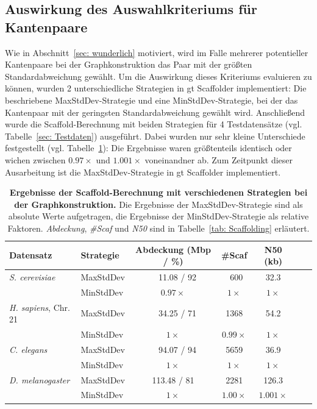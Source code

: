 \documentclass[a4paper,11pt,parskip,abstract=on]{scrartcl}
\begin{document}
\subsection{Auswirkung des Auswahlkriteriums für Kantenpaare}
\label{sec: wunderlich_assert}
Wie in Abschnitt~\ref{sec: wunderlich} motiviert, wird im Falle
mehrerer potentieller Kantenpaare bei der Graphkonstruktion das Paar
mit der größten Standardabweichung gewählt. Um die Auswirkung dieses
Kriteriums evaluieren zu können, wurden 2 unterschiedliche Strategien
in gt Scaffolder implementiert: Die beschriebene
MaxStdDev-Strategie und eine MinStdDev-Strategie, bei der das
Kantenpaar mit der geringsten Standardabweichung gewählt
wird. Anschließend wurde die Scaffold-Berechnung mit beiden Strategien
für 4 Testdatensätze (vgl. Tabelle~\ref{sec: Testdaten})
ausgeführt. Dabei wurden nur sehr kleine Unterschiede festgestellt
(vgl.  Tabelle~\ref{tab: stddev}): Die Ergebnisse waren größtenteils
identisch oder wichen zwischen $0.97\times$ und $1.001\times$
voneinandner ab. Zum Zeitpunkt dieser Ausarbeitung ist die
MaxStdDev-Strategie in gt Scaffolder implementiert.

\begin{table}
  \begin{tabular}{llccccc}
    \toprule
    Datensatz & Strategie & Abdeckung (Mbp / \%) & \#Scaf & N50 (kb)\\
    \midrule
    \textit{S. cerevisiae}
    & MaxStdDev  & ~~11.08 / 92  &      ~600   &  32.3      \\
    & MinStdDev  & $0.97\times$     &  $1\times$  & $1\times$    \\
    \midrule
    \textit{H. sapiens}, Chr. 21
    & MaxStdDev  & ~~34.25 / 71  &      1368   &  54.2      \\
    & MinStdDev  & $1\times$     &  $0.99\times$  & $1\times$    \\
    \midrule
    \textit{C. elegans}
    & MaxStdDev  & ~~94.07 / 94  &      5659   &  36.9      \\
    & MinStdDev  & $1\times$     &  $1\times$  & $1\times$    \\
    \midrule
    \textit{D. melanogaster}
    & MaxStdDev  & 113.48 / 81   &      2281   &  126.3     \\
    & MinStdDev  & $1\times$     &  $1.00\times$  & $1.001\times$    \\
    \bottomrule
  \end{tabular}
  \caption{\label{tab: stddev}\textbf{Ergebnisse der Scaffold-Berechnung mit
  verschiedenen Strategien bei der Graphkonstruktion.}
  Die Ergebnisse der MaxStdDev-Strategie sind als absolute Werte aufgetragen, die
  Ergebnisse der MinStdDev-Strategie als relative Faktoren.
  \textit{Abdeckung}, \textit{\#Scaf} und \textit{N50} sind in
  Tabelle~\ref{tab: Scaffolding} erläutert.}
\end{table}
\end{document}
